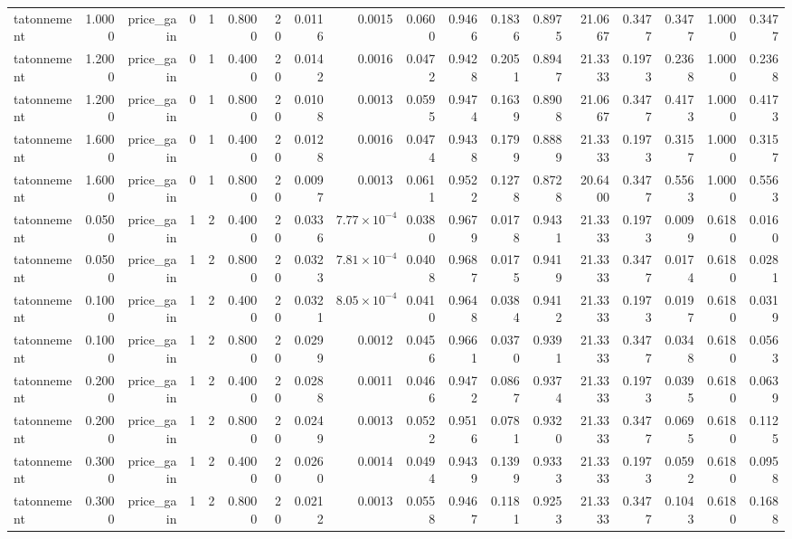 \begin{table}[htbp]
\begin{tabular}{lrrrrrrrrrrrrrrrrr}
tatonnement & 1.0000 & price\_gain & 0 & 1 & 0.8000 & 20 & 0.0116 & 0.0015 & 0.0600 & 0.9466 & 0.1836 & 0.8975 & 21.0667 & 0.3477 & 0.3477 & 1.0000 & 0.3477 \\
tatonnement & 1.2000 & price\_gain & 0 & 1 & 0.4000 & 20 & 0.0142 & 0.0016 & 0.0472 & 0.9428 & 0.2051 & 0.8947 & 21.3333 & 0.1973 & 0.2368 & 1.0000 & 0.2368 \\
tatonnement & 1.2000 & price\_gain & 0 & 1 & 0.8000 & 20 & 0.0108 & 0.0013 & 0.0595 & 0.9474 & 0.1639 & 0.8908 & 21.0667 & 0.3477 & 0.4173 & 1.0000 & 0.4173 \\
tatonnement & 1.6000 & price\_gain & 0 & 1 & 0.4000 & 20 & 0.0128 & 0.0016 & 0.0474 & 0.9438 & 0.1799 & 0.8889 & 21.3333 & 0.1973 & 0.3157 & 1.0000 & 0.3157 \\
tatonnement & 1.6000 & price\_gain & 0 & 1 & 0.8000 & 20 & 0.0097 & 0.0013 & 0.0611 & 0.9522 & 0.1278 & 0.8728 & 20.6400 & 0.3477 & 0.5563 & 1.0000 & 0.5563 \\
tatonnement & 0.0500 & price\_gain & 1 & 2 & 0.4000 & 20 & 0.0336 & $7.77\times10^{-4}$ & 0.0380 & 0.9679 & 0.0178 & 0.9431 & 21.3333 & 0.1973 & 0.0099 & 0.6180 & 0.0160 \\
tatonnement & 0.0500 & price\_gain & 1 & 2 & 0.8000 & 20 & 0.0323 & $7.81\times10^{-4}$ & 0.0408 & 0.9687 & 0.0175 & 0.9419 & 21.3333 & 0.3477 & 0.0174 & 0.6180 & 0.0281 \\
tatonnement & 0.1000 & price\_gain & 1 & 2 & 0.4000 & 20 & 0.0321 & $8.05\times10^{-4}$ & 0.0410 & 0.9648 & 0.0384 & 0.9412 & 21.3333 & 0.1973 & 0.0197 & 0.6180 & 0.0319 \\
tatonnement & 0.1000 & price\_gain & 1 & 2 & 0.8000 & 20 & 0.0299 & 0.0012 & 0.0456 & 0.9661 & 0.0370 & 0.9391 & 21.3333 & 0.3477 & 0.0348 & 0.6180 & 0.0563 \\
tatonnement & 0.2000 & price\_gain & 1 & 2 & 0.4000 & 20 & 0.0288 & 0.0011 & 0.0466 & 0.9472 & 0.0867 & 0.9374 & 21.3333 & 0.1973 & 0.0395 & 0.6180 & 0.0639 \\
tatonnement & 0.2000 & price\_gain & 1 & 2 & 0.8000 & 20 & 0.0249 & 0.0013 & 0.0522 & 0.9516 & 0.0781 & 0.9320 & 21.3333 & 0.3477 & 0.0695 & 0.6180 & 0.1125 \\
tatonnement & 0.3000 & price\_gain & 1 & 2 & 0.4000 & 20 & 0.0260 & 0.0014 & 0.0494 & 0.9439 & 0.1399 & 0.9333 & 21.3333 & 0.1973 & 0.0592 & 0.6180 & 0.0958 \\
tatonnement & 0.3000 & price\_gain & 1 & 2 & 0.8000 & 20 & 0.0212 & 0.0013 & 0.0558 & 0.9467 & 0.1181 & 0.9253 & 21.3333 & 0.3477 & 0.1043 & 0.6180 & 0.1688 \\

\end{tabular}
\end{table}
